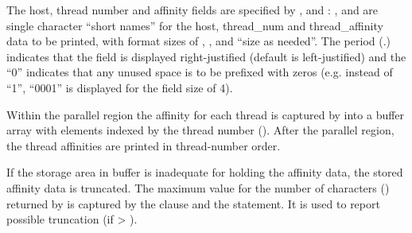 The host, thread number and affinity fields are specified by , 
 and : ,  and  are single character ``short names''
for the host, thread\_num and thread\_affinity data to be printed,
with format sizes of , , and ``size as needed''.
The period (.) indicates that the field is displayed right-justified (default is left-justified) 
and the ``0'' indicates that any unused space is to be prefixed with zeros
(e.g. instead of ``1'', ``0001'' is displayed for the field size of 4).

Within the parallel region the affinity for each thread is captured by 
 into a buffer array with elements indexed 
by the thread number ().
After the parallel region, the thread affinities are printed in thread-number order.

If the storage area in buffer is inadequate for holding the affinity
data, the stored affinity data is truncated.  
The maximum value for the number of characters () returned by 
 is captured by the 
clause and the  statement. 
It is used to report possible truncation (if  > ).



